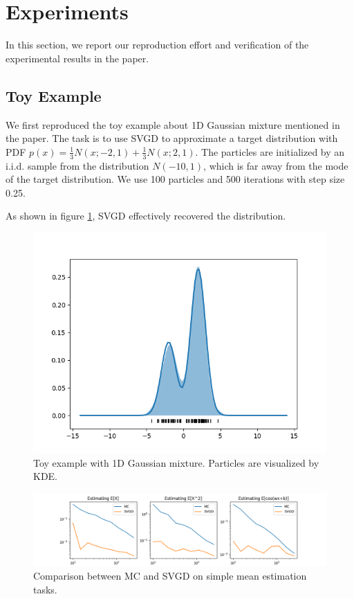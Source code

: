 \section{Experiments}
In this section, we report our reproduction effort and verification of the experimental results in the paper.

\subsection{Toy Example}

We first reproduced the toy example about 1D Gaussian mixture mentioned in the paper. The task is to use SVGD to approximate a target distribution with PDF $p(x) = \frac{1}{3} N(x; -2, 1) + \frac{1}{3} N(x; 2, 1)$. The particles are initialized by an i.i.d. sample from the distribution $N(-10, 1)$, which is far away from the mode of the target distribution. We use 100 particles and 500 iterations with step size 0.25. 

As shown in figure \ref{fig:toy1dgaussian-1}, SVGD effectively recovered the distribution.

\begin{figure}[h]
    \centering
    \includegraphics[width=\textwidth]{original-code/Toy-Examples/mixture1d_iter_500.png}
    \caption{Toy example with 1D Gaussian mixture. Particles are visualized by KDE.}
    \label{fig:toy1dgaussian-1}
\end{figure}

\begin{figure}[h]
    \centering
    \includegraphics[width=\textwidth]{figs/toy-figure2.png}
    \caption{Comparison between MC and SVGD on simple mean estimation tasks. }
    \label{fig:my_label}
\end{figure}

